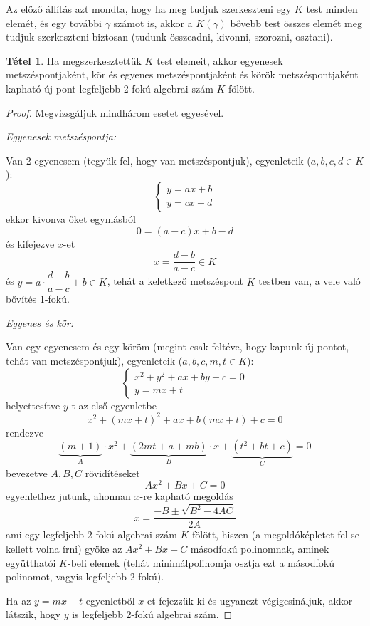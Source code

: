 \documentclass[12pt]{book}
\theoremstyle{plain} %
\theoremstyle{definition} %
\newtheorem{theo/}{Tétel}[section]
\newenvironment{theo}
  {\renewcommand{\qedsymbol}{$\clubsuit$}%
   \pushQED{\qed}\begin{theo/}}
  {\popQED\end{theo/}}
\theoremstyle{remark}
\renewcommand\qedsymbol{$\blacksquare$}
\numberwithin{equation}{section}  %
\begin{document}
	Az előző állítás azt mondta, hogy ha meg tudjuk szerkeszteni egy $K$ test minden elemét, és egy további $\gamma$ számot is, akkor a $K(\gamma)$ bővebb test összes elemét meg tudjuk szerkeszteni biztosan (tudunk összeadni, kivonni, szorozni, osztani).
	
	\begin{theo}
		Ha megszerkesztettük $K$ test elemeit, akkor egyenesek metszéspontjaként, kör és egyenes metszéspontjaként és körök metszéspontjaként kapható új pont legfeljebb 2-fokú algebrai szám $K$ fölött.
	\end{theo}

	\begin{proof}
		Megvizsgáljuk mindhárom esetet egyesével.
		
		\textit{Egyenesek metszéspontja:}
		
		Van 2 egyenesem (tegyük fel, hogy van metszéspontjuk), egyenleteik ($a,b,c,d\in K$):
		\[
		\begin{cases*}
		y = ax+b \\
		y = cx+d 
		\end{cases*}
		\]
		ekkor kivonva őket egymásból
		\[ 0 = (a-c)x+b-d  \]
		és kifejezve $x$-et
		\[ x = \dfrac{d-b}{a-c} \in K   \]
		és $y = a\cdot \dfrac{d-b}{a-c} +b \in K $, tehát a keletkező metszéspont $K$ testben van, a vele való bővítés 1-fokú.
		
		\textit{Egyenes és kör:}
		
		Van egy egyenesem és egy köröm (megint csak feltéve, hogy kapunk új pontot, tehát van metszéspontjuk), egyenleteik ($a,b,c,m,t\in K$):
		\[
		\begin{cases*}
		x^2+y^2+ax+by+c = 0 \\
		y = mx+t
		\end{cases*}
		\]
		helyettesítve $y$-t az első egyenletbe
		\[ x^2+(mx+t)^2+ax+b(mx+t)+c=0  \]
		rendezve
		\[ \underbrace{(m+1)}_{A}\cdot x^2 + \underbrace{(2mt+a+mb)}_{B}\cdot x + \underbrace{(t^2+ bt +c)}_{C} =0  \]
		bevezetve $A,B,C$ rövidítéseket
		\[ Ax^2+Bx+C = 0 \]
		egyenlethez jutunk, ahonnan $x$-re kapható megoldás
		\[ x = \dfrac{-B\pm \sqrt{B^2-4AC}}{2A}  \]
		ami egy legfeljebb 2-fokú algebrai szám $K$ fölött, hiszen (a megoldóképletet fel se kellett volna írni) gyöke az $Ax^2+Bx+C$ másodfokú polinomnak, aminek együtthatói $K$-beli elemek (tehát minimálpolinomja osztja ezt a másodfokú polinomot, vagyis legfeljebb 2-fokú). 
		
		Ha az $y=mx+t$ egyenletből $x$-et fejezzük ki és ugyanezt végigcsináljuk, akkor látszik, hogy $y$ is legfeljebb 2-fokú algebrai szám.
		

\end{proof}
\end{document}
